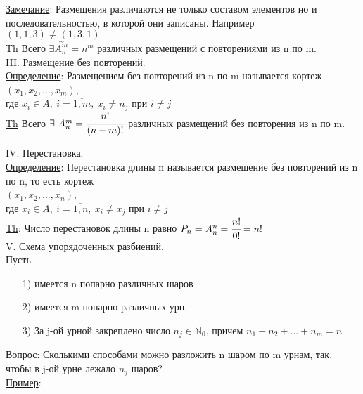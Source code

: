 \underline{Замечание}: Размещения различаются не только составом элементов но и последовательностью, в которой они записаны. Например \\
$(1,1,3) \neq (1,3,1)$ \\


\underline{Th} Всего $\exists \stackrel{\sim}{A^m_n} = n^m$ различных размещений с повторениями из n по m. \\




III. Размещение без повторений. \\
\underline{Определение}: Размещением без повторений из n по m называется кортеж \\
$(x_1, x_2, \ldots, x_m)$, \\
где $x_i \in A, \ i = \overline{1,m}, \ x_i \neq n_j$ при $i \neq j$ \\


\underline{Th} Всего $\exists \ A^m_n = \cfrac{n!}{(n-m)!}$ различных размещений без повторения из n по m.




IV. Перестановка. \\
\underline{Определение}: Перестановка длины n называется размещение без повторений из n по n, то есть кортеж \\
$(x_1, x_2, \ldots , x_n)$, \\
где $x_i \in A, \ i = \overline{1,n}, \ x_i \neq x_j$ при $i \neq j$ \\

\underline{Th}: Число перестановок длины n равно $P_n = A^n_n = \cfrac{n!}{0!} = n!$ \\


V. Схема упорядоченных разбиений. \\
Пусть \\
\begin{enumerate}
\item[1)] имеется n попарно различных шаров

\item[2)] имеется m попарно различных урн. \\

\item[3)] За j-ой урной закреплено число $n_j \in \mathbb{N}_0$, причем $n_1 + n_2 + \ldots + n_m = n$ \\
\end{enumerate}
Вопрос: Сколькими способами можно разложить n шаром по m урнам, так, чтобы в j-ой урне лежало $n_j$ шаров? \\
\underline{Пример}:

